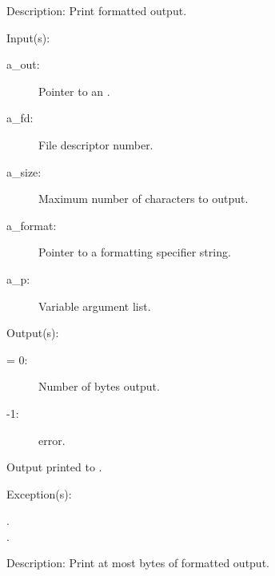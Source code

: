 \begin{capi}
\begin{capilist}
	\item[Description: ]
		Print formatted output.
	\end{capilist}
\label{out_put_fvn}
	\begin{capilist}
	\item[Input(s): ]
		\begin{description}\item[]
		\item[a\_out: ]
			Pointer to an .
		\item[a\_fd: ]
			File descriptor number.
		\item[a\_size: ]
			Maximum number of characters to output.
		\item[a\_format: ]
			Pointer to a formatting specifier string.
		\item[a\_p: ]
			Variable argument list.
		\end{description}
	\item[Output(s): ]
		\begin{description}\item[]
		\item[retval: ]
			\begin{description}\item[]
			\item[{\gt}= 0: ]
				Number of bytes output.
			\item[-1: ]
				 error.
			\end{description}
		\item{Output printed to .}
		\end{description}
	\item[Exception(s): ]
		\begin{description}\item[]
		\item[.]
		\item[.]
		\end{description}
	\item[Description: ]
		Print at most  bytes of formatted output.
	\end{capilist}
\label{out_put_s}
\label{_cw_out_put_s}

\end{capi}
